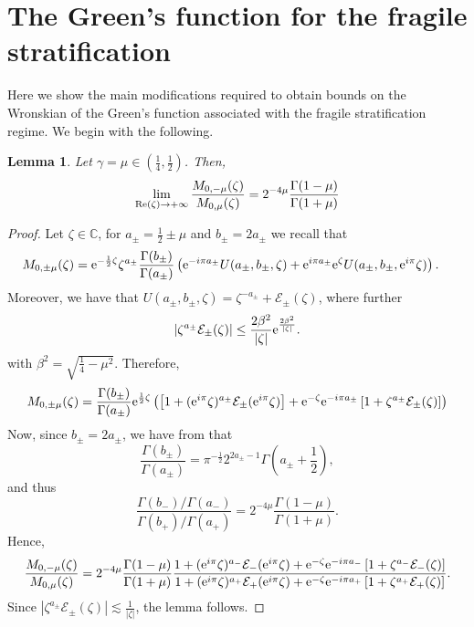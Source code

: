 \documentclass[11pt,reqno]{amsproc}
\newtheorem{lemma}[proposition]{Lemma}
\theoremstyle{definition}
\numberwithin{equation}{section}
\newcommand{\C}{{\mathbb C}}
\newcommand{\E}{{\mathcal E}}
\newcommand\e{{\rm e}}
\renewcommand{\b}{\beta}
\renewcommand{\l}{\left}
\renewcommand{\r}{\right}
\def\Re{{\rm Re}}
\begin{document}
\section{The Green's function for the fragile stratification}
Here we show the main modifications required to obtain bounds on the Wronskian of the Green's function associated with the fragile stratification regime. We begin with the following.

\begin{lemma}\label{lemma:growthboundMfragile}
Let $\gamma =\mu \in \left( \frac14, \frac12 \right)$. Then, 
\begin{equation*}
\lim_{\Re(\zeta)\rightarrow +\infty}\frac{M_{0,-\mu}(\zeta)}{M_{0,\mu}(\zeta)} = 2^{-4\mu}\frac{\Gamma(1-\mu)}{\Gamma(1+\mu)} 
\end{equation*} 
\end{lemma}

\begin{proof}
Let $\zeta\in\C$, for $a_\pm = \frac12\pm \mu$ and $b_\pm =2a_\pm$ we recall that
\begin{equation*}
\begin{aligned}
M_{0,\pm\mu}(\zeta)&=\e^{-\frac12\zeta}\zeta^{a_\pm}\frac{\Gamma(b_\pm)}{\Gamma(a_\pm)}\l( \e^{-i\pi a_\pm}U(a_\pm,b_\pm,\zeta) + \e^{i\pi a_\pm}\e^\zeta U(a_\pm,b_\pm,\e^{i\pi} \zeta)\r).
\end{aligned}
\end{equation*}
Moreover, we have that $U(a_\pm,b_\pm,\zeta) = \zeta^{-a_\pm}+ \mathcal{E}_{\pm}(\zeta)$, where further
\begin{equation*}
|\zeta^{a_\pm}\E_\pm(\zeta)|\leq \frac{2\b^2}{|\zeta|}\e^{\frac{2\b^2}{|\zeta|}}.
\end{equation*}
with $\beta^2 = \sqrt{\frac14 - \mu^2}$. Therefore, 
\begin{equation*}
M_{0,\pm\mu}(\zeta)=\frac{\Gamma(b_\pm)}{\Gamma(a_\pm)}\e^{\frac12\zeta}\l(  \l[1 + (\e^{i\pi}\zeta)^{a_\pm}\E_\pm(\e^{i\pi}\zeta)\r] + \e^{-\zeta}\e^{-i\pi a_\pm}\l[1+ \zeta^{a_\pm}\E_\pm(\zeta)\r]\r)
\end{equation*}
Now, since $b_\pm=2a_\pm$, we have from \cite{NIST} that
\begin{equation*}
\frac{\Gamma(b_\pm)}{\Gamma(a_\pm)}=\pi^{-\frac12}2^{2a_\pm-1}\Gamma\l( a_\pm +\frac12\r),
\end{equation*}
and thus
\begin{equation*}
\frac{\displaystyle {\Gamma(b_-)}/{\Gamma(a_-)}}{\displaystyle {\Gamma(b_+)}/{\Gamma(a_+)}}=2^{-4\mu}\frac{\Gamma(1-\mu)}{\Gamma(1+\mu)}.
\end{equation*}
Hence,
\begin{equation*}
\frac{M_{0,-\mu}(\zeta)}{M_{0,\mu}(\zeta)}=2^{-4\mu}\frac{\Gamma(1-\mu)}{\Gamma(1+\mu)}\frac{ 1 + (\e^{i\pi}\zeta)^{a_-}\E_-(\e^{i\pi}\zeta) + \e^{-\zeta}\e^{-i\pi a_-}\l[1+ \zeta^{a_-}\E_-(\zeta)\r]}{  1 + (\e^{i\pi}\zeta)^{a_+}\E_+(\e^{i\pi}\zeta) + \e^{-\zeta}\e^{-i\pi a_+}\l[1+ \zeta^{a_+}\E_+(\zeta)\r]}.
\end{equation*}
Since $|\zeta^{a_\pm}\E_\pm(\zeta)|\lesssim \frac{1}{|\zeta|}$, the lemma follows.
\end{proof}
\end{document}

